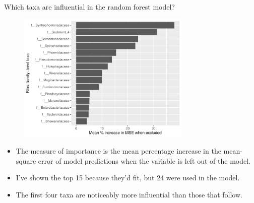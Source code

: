 \documentclass{beamer}
\begin{document}
\begin{frame}{Which taxa are influential in the random forest model?}

  \begin{center}
    \begin{figure}
      \includegraphics[width=3.25in]
      {use_families/w_ribs/w_baseline/families_rib_PercIncMSE_barchart}
    \end{figure}
  \end{center}
  \vspace{-0.1in}
  {\scriptsize
  \begin{itemize}
  \item The measure of importance is the mean percentage increase in the
    mean-square error of model predictions when the variable is left out of the
    model. 
  \item I've shown the top 15 because they'd fit, but 24 were used in the model.
  \item The first four taxa are noticeably more influential than those that
  follow.
  \end{itemize}
  }

\end{frame}
\end{document}
